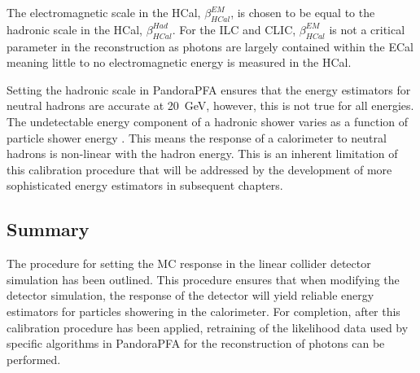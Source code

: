 The electromagnetic scale in the HCal, $\beta^{EM}_{HCal}$, is chosen to be equal to the hadronic scale in the HCal, $\beta^{Had}_{HCal}$.  For the ILC and CLIC, $\beta^{EM}_{HCal}$ is not a critical parameter in the reconstruction as photons are largely contained within the ECal meaning little to no electromagnetic energy is measured in the HCal.  

Setting the hadronic scale in PandoraPFA ensures that the energy estimators for neutral hadrons are accurate at 20~GeV, however, this is not true for all energies.  The undetectable energy component of a hadronic shower varies as a function of particle shower energy \cite{Wigmans:2000vf}.  This means the response of a calorimeter to neutral hadrons is non-linear with the hadron energy.  This is an inherent limitation of this calibration procedure that will be addressed by the development of more sophisticated energy estimators in subsequent chapters.  


\subsection{Summary}
The procedure for setting the MC response in the linear collider detector simulation has been outlined.  This procedure ensures that when modifying the detector simulation, the response of the detector will yield reliable energy estimators for particles showering in the calorimeter.  For completion, after this calibration procedure has been applied, retraining of the likelihood data used by specific algorithms in PandoraPFA for the reconstruction of photons can be performed.  


